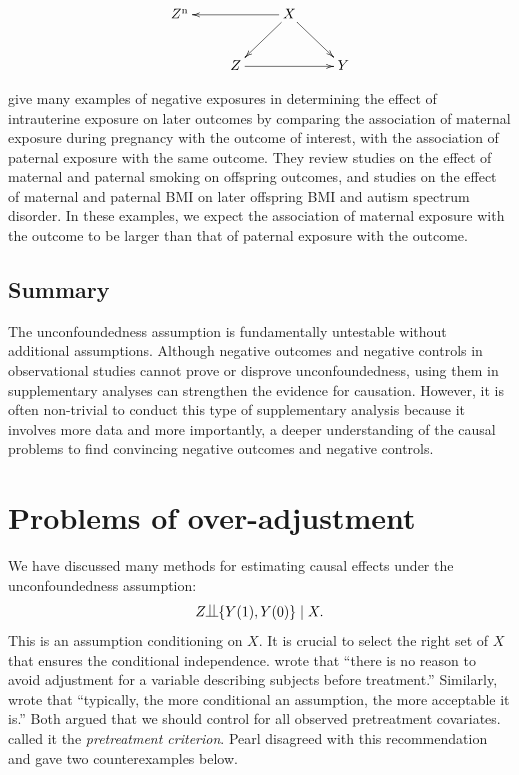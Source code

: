$$
\xymatrix{
Z^\textup{n} & & X \ar[ll] \ar[ld]\ar[rd] \\
&Z  \ar[rr] && Y 
}
$$




\begin{example}
\citet{sanderson2017negative} give many examples of negative exposures in determining the effect of intrauterine exposure on later outcomes by comparing the association of maternal exposure during pregnancy with the outcome of interest, with the association of paternal exposure with the same outcome. They review studies on the effect of maternal and paternal smoking on offspring outcomes, and studies on the effect of maternal and paternal BMI on later offspring BMI and autism spectrum disorder.  In these examples, we expect the association of maternal exposure with the outcome to be larger than that of paternal exposure with the outcome. 
\end{example}



\subsection{Summary}


The unconfoundedness assumption is fundamentally untestable without additional assumptions. Although negative outcomes and negative controls in observational studies cannot prove or disprove unconfoundedness, using them in supplementary analyses can strengthen the evidence for causation. However, it is often non-trivial to conduct this type of supplementary analysis because it involves more data and more importantly, a deeper understanding of the causal problems to find convincing negative outcomes and negative controls. 

 
 


\section{Problems of over-adjustment}
\label{sec::pearl-bias}

We have discussed many methods for estimating causal effects under the unconfoundedness assumption:
$$
Z\ind \{ Y(1), Y(0) \} \mid X .
$$
This is an assumption conditioning on $X$. It is crucial to select the right set of $X$ that ensures the conditional independence. 
\citet{rosenbaum2002design} wrote that ``there is no reason to avoid adjustment for a variable describing subjects before treatment.'' Similarly, \citet{rubin2007design} wrote that ``typically, the more conditional an assumption, the more acceptable it is.'' Both argued that we should control for all observed pretreatment covariates. \citet{vanderweele2011new} called it the {\it pretreatment criterion}. 
Pearl disagreed with this recommendation and gave two counterexamples below. 


